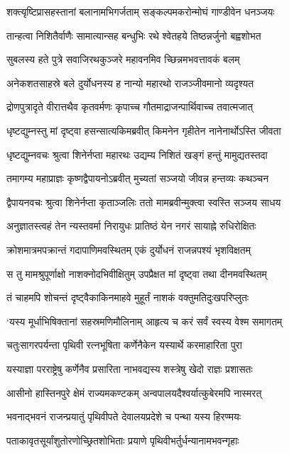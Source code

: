 \twolineshloka
{शक्त्यृष्टिप्रासहस्तानां बलानामभिगर्जताम्}
{सङ्कल्पमकरोन्मोघं गाण्डीवेन धनञ्जयः}


\twolineshloka
{तान्हत्वा निशितैर्वाणैः सामात्यान्सह बन्धुभिः}
{रथे श्वेतहये तिष्ठन्नर्जुनो बह्वशोभत}


\twolineshloka
{सुबलस्य हते पुत्रे सवाजिरथकुञ्जरे}
{महावनमिव च्छिन्नमभवत्तावकं बलम्}


\twolineshloka
{अनेकशतसाहस्रे बले दुर्योधनस्य ह}
{नान्यो महारथो राजञ्जीवमानो व्यदृश्यत}


\twolineshloka
{द्रोणपुत्रादृते वीरात्तथैव कृतवर्मणः}
{कृपाच्च गौतमाद्राजन्पार्थिवाच्च तवात्मजात्}


\twolineshloka
{धृष्टद्युम्नस्तु मां दृष्ट्वा हसन्सात्यकिमब्रवीत्}
{किमनेन गृहीतेन नानेनार्थोऽस्ति जीवता}


\twolineshloka
{धृष्टद्युम्नवचः श्रुत्वा शिनेर्नप्ता महारथः}
{उद्यम्य निशितं खङ्गं हन्तुं मामुद्यतस्तदा}


\twolineshloka
{तमागम्य महाप्राज्ञः कृष्णद्वैपायनोऽब्रवीत्}
{मुच्यतां सञ्जयो जीवन्न हन्तव्यः कथञ्चन}


\twolineshloka
{द्वैपायनवचः श्रुत्वा शिनेर्नप्ता कृताञ्जलिः}
{ततो मामब्रवीन्मुक्त्वा स्वस्ति सञ्जय साधय}


\twolineshloka
{अनुज्ञातस्त्वहं तेन न्यस्तवर्मा निरायुधः}
{प्रातिष्ठं येन नगरं सायाह्ने रुधिरोक्षितः}


\twolineshloka
{क्रोशमात्रमपक्रान्तं गदापाणिमवस्थितम्}
{एकं दुर्योधनं राजन्नपश्यं भृशविक्षतम्}


\twolineshloka
{स तु मामश्रुपूर्णाक्षो नाशक्नोदभिवीक्षितुम्}
{उपप्रैक्षत मां दृष्ट्वा तथा दीनमवस्थितम्}


\twolineshloka
{तं चाहमपि शोचन्तं दृष्ट्वैकाकिनमाहवे}
{मुहूर्तं नाशकं वक्तुमतिदुःखपरिप्लुतः}


\twolineshloka
{`यस्य मूर्धाभिषिक्तानां सहस्रमणिमौलिनाम्}
{आहृत्य च करं सर्वं स्वस्य वेश्म समागतम्}


\twolineshloka
{चतुःसागरपर्यन्ता पृथिवी रत्नभूषिता}
{कर्णेनैकेन यस्यार्थे करमाहारिता पुरा}


\twolineshloka
{यस्याज्ञा परराष्ट्रेषु कर्णेनैव प्रसारिता}
{नाभवद्यस्य शस्त्रेषु खेदो राज्ञः प्रशासतः}


\twolineshloka
{आसीनो हास्तिनपुरे क्षेमं राज्यमकण्टकम्}
{अन्वपालयदैश्वर्यात्कुबेरमपि नास्मरत्}


\twolineshloka
{भवनाद्भवनं राजन्प्रयातुं पृथिवीपते}
{देवालयप्रदेशे च पन्था यस्य हिरण्मयः}


\twolineshloka
{पताकावृतसूर्यांशुतोरणोच्छ्रितशोभिताः}
{प्रयाणे पृथिवीभर्तुर्धन्यानामभवन्गृहाः}


